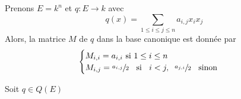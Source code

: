 \begin{ex}
    Prenons $E=k^n$ et  $q:E \longrightarrow k$ avec \[q(x)=\sum_{1\leq i\leq j\leq n}a_{i,j}x_ix_j\]
    Alors, la matrice $M$ de $q$ dans la base canonique est donnée par \[
    \begin{cases}
        M_{i,i}=a_{i,i}\text{ si }1\leq i\leq n\\
        M_{i,j}= \sfrac{a_{i,j}}2 \;\;\text{ si }\;\;i<j, \;\;\sfrac{a_{j,i}}2\;\;\text{ sinon }
    \end{cases}
    \] 
\end{ex}

\begin{prop}
    Soit $q \in  Q(E)$
\end{prop}
